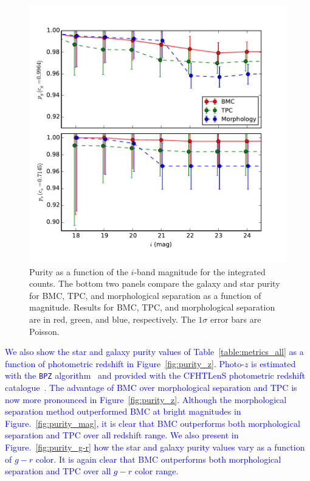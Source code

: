 \documentclass[useAMS,usenatbib]{mn2e}
\begin{document}
\begin{figure}
  \centering
  \includegraphics[width=\linewidth]{figures/purity_mag_integrated.pdf}
  \caption{Purity as a function of the $i$-band magnitude
           for the integrated counts.
           The bottom two panels compare
           the galaxy and star purity for BMC, TPC, and 
           morphological separation as a function of magnitude.
           Results for BMC, TPC, and morphological separation are in
           red, green, and blue, respectively.
           The $1 \sigma$ error bars are Poisson.}
  \label{fig:purity_mag_integrated}
\end{figure}


\textcolor{blue}{We also show the star and galaxy purity values
of Table~\ref{table:metrics_all} as a function of
photometric redshift in Figure~\ref{fig:purity_z}.
Photo-$z$ is estimated with
the \texttt{BPZ} algorithm~\citep{benitez2000bayesian}
and provided with
the CFHTLenS photometric redshift catalogue~\citep{Hildebrandt2012}.
The advantage of BMC over morphological separation and TPC is
now more pronounced in Figure~\ref{fig:purity_z}.
Although the morphological separation method outperformed BMC
at bright magnitudes in Figure.~\ref{fig:purity_mag},
it is clear that BMC outperforms
both morphological separation and TPC over all redshift range.
We also present in Figure.~\ref{fig:purity_g-r}
how the star and galaxy purity values vary
as a function of $g-r$ color.
It is again clear that BMC outperforms
both morphological separation and TPC over all $g-r$ color range.  }
\end{document}

